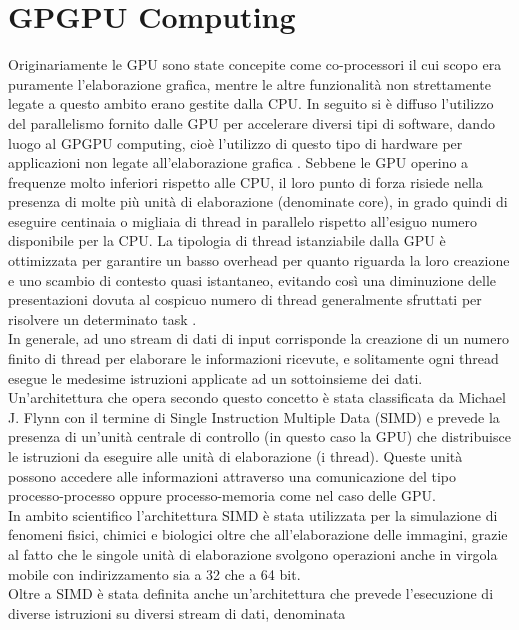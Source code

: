 \section{GPGPU Computing}

Originariamente le GPU sono state concepite
come co-processori il cui scopo
era puramente l'elaborazione grafica, mentre le altre funzionalità
non strettamente legate a questo ambito erano gestite dalla CPU.
In seguito si è diffuso l'utilizzo del parallelismo fornito dalle GPU
per accelerare diversi tipi di software, dando luogo al GPGPU computing, 
cioè l'utilizzo di questo tipo di hardware
per applicazioni non legate all'elaborazione grafica \cite{nickolls2010gpu}.
Sebbene le GPU operino a frequenze molto inferiori rispetto alle CPU, il loro
punto di forza risiede nella presenza di molte più unità di elaborazione
(denominate core), in grado quindi di eseguire centinaia o migliaia di thread
in parallelo rispetto all'esiguo numero disponibile per la CPU.
La tipologia di thread
istanziabile dalla GPU è ottimizzata per garantire un basso overhead
per quanto riguarda la loro creazione e uno scambio di contesto quasi
istantaneo, evitando così una diminuzione delle presentazioni dovuta al cospicuo
numero di thread generalmente sfruttati per risolvere un determinato task
\cite{kirk2007nvidia}.
\\
In generale, ad uno stream di dati di input corrisponde la creazione di un
numero finito di thread per elaborare le informazioni ricevute, e solitamente
ogni thread esegue le medesime istruzioni applicate ad un sottoinsieme
dei dati. Un'architettura che opera secondo questo concetto è stata
classificata da Michael J. Flynn con il termine di Single Instruction Multiple 
Data (SIMD)\cite{duncan1990survey} e prevede
la presenza di un'unità centrale di controllo (in questo caso la GPU) che
distribuisce le istruzioni da eseguire alle unità di elaborazione (i thread).
Queste unità possono accedere alle informazioni attraverso una comunicazione
del tipo processo-processo oppure processo-memoria come nel caso delle GPU.
\\
In ambito scientifico l'architettura SIMD è stata utilizzata per la simulazione
di fenomeni fisici, chimici e biologici oltre che all'elaborazione delle
immagini, grazie al fatto che le singole unità di elaborazione svolgono
operazioni anche in virgola mobile con indirizzamento sia a 32 che a 64 bit.
\\
Oltre a SIMD è stata definita anche un'architettura che prevede
l'esecuzione di diverse istruzioni su diversi stream di dati, denominata
